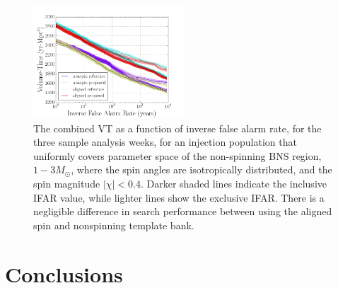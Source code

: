 \begin{figure}
\centering
\includegraphics[width=0.5\textwidth]{papers/bns_o1_dev/figures/prec_combined.png}
\caption{\label{fig:prec} 
The combined VT as a function of inverse false alarm rate, for the
three sample analysis weeks, for an injection population that uniformly covers parameter space of the non-spinning BNS region, $1- 3M_\odot$, where
the spin angles are isotropically distributed, and the spin magnitude $|\chi| < 0.4$. Darker shaded lines indicate the inclusive IFAR value, while lighter lines show the exclusive IFAR. There is a negligible difference in search performance between using the aligned spin and nonspinning template bank.
}
\end{figure}


\section{Conclusions}

